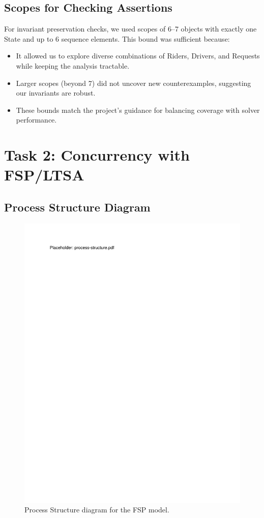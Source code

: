 \documentclass[11pt]{article}
\begin{document}
\subsection{Scopes for Checking Assertions}

For invariant preservation checks, we used scopes of 6–7 objects with exactly one State and up to 6 sequence elements. 
This bound was sufficient because:
\begin{itemize}[leftmargin=1.5em]
  \item It allowed us to explore diverse combinations of Riders, Drivers, and Requests while keeping the analysis tractable.
  \item Larger scopes (beyond 7) did not uncover new counterexamples, suggesting our invariants are robust.
  \item These bounds match the project’s guidance for balancing coverage with solver performance.
\end{itemize}

\section{Task 2: Concurrency with FSP/LTSA}
\label{sec:task2}

\subsection{Process Structure Diagram}

\label{sec:process-structure}
\begin{figure}[h]
  \centering
  \includegraphics[width=0.50\linewidth]{figs/process-structure.pdf}
  \caption{Process Structure diagram for the FSP model.}
\end{figure}
\end{document}
